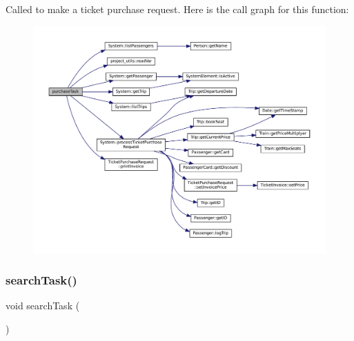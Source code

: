 Called to make a ticket purchase request. Here is the call graph for this function\+:
\nopagebreak
\begin{figure}[H]
\begin{center}
\leavevmode
\includegraphics[width=350pt]{Train-System_8cpp_a94e2f63ee8229943a5825715b3fe6843_cgraph}
\end{center}
\end{figure}
\mbox{\label{Train-System_8cpp_aa304a31243db94cf775bdf5014252981}} 
\subsubsection{\texorpdfstring{search\+Task()}{searchTask()}}
{\footnotesize\ttfamily void search\+Task (\begin{DoxyParamCaption}{ }\end{DoxyParamCaption})}

